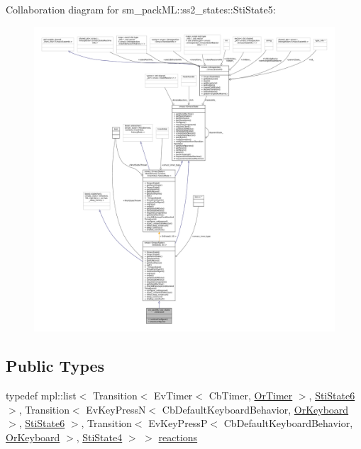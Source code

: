 Collaboration diagram for sm\+\_\+pack\+ML\+:\+:ss2\+\_\+states\+:\+:Sti\+State5\+:
\nopagebreak
\begin{figure}[H]
\begin{center}
\leavevmode
\includegraphics[width=350pt]{structsm__packML_1_1ss2__states_1_1StiState5__coll__graph}
\end{center}
\end{figure}
\subsection*{Public Types}
\begin{DoxyCompactItemize}
\item 
typedef mpl\+::list$<$ Transition$<$ Ev\+Timer$<$ Cb\+Timer, \hyperlink{classsm__packML_1_1OrTimer}{Or\+Timer} $>$, \hyperlink{structsm__packML_1_1ss2__states_1_1StiState6}{Sti\+State6} $>$, Transition$<$ Ev\+Key\+PressN$<$ Cb\+Default\+Keyboard\+Behavior, \hyperlink{classsm__packML_1_1OrKeyboard}{Or\+Keyboard} $>$, \hyperlink{structsm__packML_1_1ss2__states_1_1StiState6}{Sti\+State6} $>$, Transition$<$ Ev\+Key\+PressP$<$ Cb\+Default\+Keyboard\+Behavior, \hyperlink{classsm__packML_1_1OrKeyboard}{Or\+Keyboard} $>$, \hyperlink{structsm__packML_1_1ss2__states_1_1StiState4}{Sti\+State4} $>$ $>$ \hyperlink{structsm__packML_1_1ss2__states_1_1StiState5_a1e9fe3c799de348f5140e177f0a9200e}{reactions}
\end{DoxyCompactItemize}
